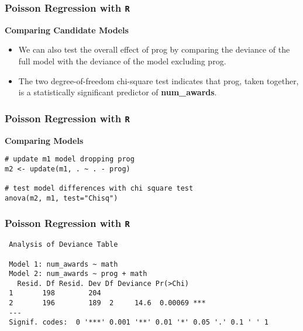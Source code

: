 \documentclass[00-GLMregslides.tex]{subfiles}
\begin{document}
%
%
% 

\begin{frame}[fragile]

\frametitle{Poisson Regression with \texttt{R}}
\Large 
\textbf{Comparing Candidate Models}
\begin{itemize}
\item 
We can also test the overall effect of prog by comparing the deviance of the full model with the deviance of the model 
excluding prog.
\item The two degree-of-freedom chi-square test indicates that prog, taken together, is a statistically significant predictor of \textbf{num\_awards}.
\end{itemize} 

\end{frame}

\begin{frame}[fragile]

\frametitle{Poisson Regression with \texttt{R}}
\large
\textbf{Comparing Models}
\begin{framed}
\begin{verbatim}
# update m1 model dropping prog
m2 <- update(m1, . ~ . - prog)

# test model differences with chi square test
anova(m2, m1, test="Chisq")
\end{verbatim}
\end{framed}
\end{frame}


\begin{frame}[fragile]

\frametitle{Poisson Regression with \texttt{R}}

\begin{verbatim}
 Analysis of Deviance Table
 
 Model 1: num_awards ~ math
 Model 2: num_awards ~ prog + math
   Resid. Df Resid. Dev Df Deviance Pr(>Chi)    
 1       198        204                         
 2       196        189  2     14.6  0.00069 ***
 ---
 Signif. codes:  0 '***' 0.001 '**' 0.01 '*' 0.05 '.' 0.1 ' ' 1
\end{verbatim}

\end{frame}
\end{document}

